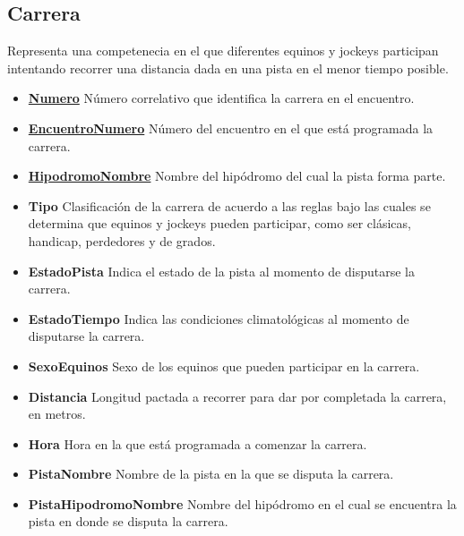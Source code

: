 \documentclass[a4paper,11pt]{article}
\begin{document}
\subsection{Carrera}

Representa una competenecia en el que diferentes equinos y jockeys participan
intentando recorrer una distancia dada en una pista en el menor tiempo posible.

\begin{itemize}

  \item \textbf{\uline{Numero}} Número correlativo que identifica la carrera en
    el encuentro.

  \item \textbf{\uline{EncuentroNumero}} Número del encuentro en el que está
    programada la carrera.

  \item \textbf{\uline{HipodromoNombre}} Nombre del hipódromo del
    cual la pista forma parte.

  \item \textbf{Tipo} Clasificación de la carrera de acuerdo a las reglas bajo
    las cuales se determina que equinos y jockeys pueden participar, como ser
    clásicas, handicap, perdedores y de grados.

  \item \textbf{EstadoPista} Indica el estado de la pista al momento de
    disputarse la carrera.

  \item \textbf{EstadoTiempo} Indica las condiciones climatológicas al momento
    de disputarse la carrera.

  \item \textbf{SexoEquinos} Sexo de los equinos que pueden participar en la
    carrera.

  \item \textbf{Distancia} Longitud pactada a recorrer para dar por completada
    la carrera, en metros.

  \item \textbf{Hora} Hora en la que está programada a comenzar la carrera.

  \item \textbf{PistaNombre} Nombre de la pista en la que se disputa la
    carrera.

  \item \textbf{PistaHipodromoNombre} Nombre del hipódromo en el cual se
    encuentra la pista en donde se disputa la carrera.

\end{itemize}
\end{document}
